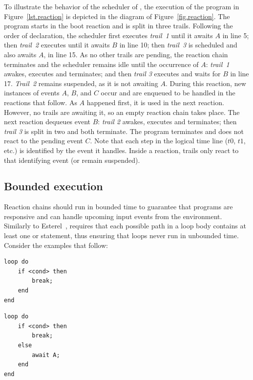 To illustrate the behavior of the scheduler of \CEU, the execution of the 
program in Figure~\ref{lst.reaction} is depicted in the diagram of 
Figure~\ref{fig.reaction}.
%
The program starts in the boot reaction and is split in three trails.
Following the order of declaration, the scheduler first executes \emph{trail~1} 
until it awaits $A$ in line 5;
then \emph{trail~2} executes until it awaits $B$ in line 10;
then \emph{trail~3} is scheduled and also awaits $A$, in line 15.
%
As no other trails are pending, the reaction chain terminates and the scheduler 
remains idle until the occurrence of $A$:
\emph{trail~1} awakes, executes and terminates;
and then \emph{trail 3} executes and waits for $B$ in line 17.
\emph{Trail~2} remains suspended, as it is not awaiting $A$.
%
During this reaction, new instances of events $A$, $B$, and $C$ occur and are 
enqueued to be handled in the reactions that follow.
%
As $A$ happened first, it is used in the next reaction.
However, no trails are awaiting it, so an empty reaction chain takes place.
%
The next reaction dequeues event $B$:
\emph{trail 2} awakes, executes and terminates;
then \emph{trail 3} is split in two and both terminate.
%
The program terminates and does not react to the pending event $C$.
%
Note that each step in the logical time line ($t0$, $t1$, etc.) is identified 
by the event it handles.
Inside a reaction, trails only react to that identifying event (or remain 
suspended).

\subsection{Bounded execution}

Reaction chains should run in bounded time to guarantee that programs are 
responsive and can handle upcoming input events from the environment.
Similarly to Esterel~\cite{esterel.ieee91}, \CEU requires that each possible 
path in a loop body contains at least one  or  
statement, thus ensuring that loops never run in unbounded time.
%
Consider the examples that follow:

\nopagebreak
\noindent
\begin{minipage}[t]{0.45\linewidth}
\begin{lstlisting}
loop do
    if <cond> then
        break;
    end
end
\end{lstlisting}
\end{minipage}
%
\begin{minipage}[t]{0.45\linewidth}
\begin{lstlisting}
loop do
    if <cond> then
        break;
    else
        await A;
    end
end
\end{lstlisting}
\end{minipage}

